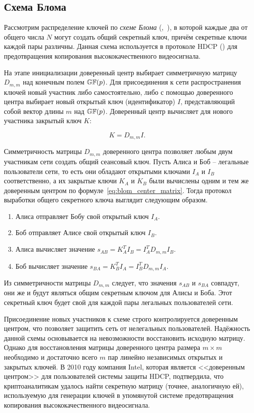 \subsection{Схема Блома}

Рассмотрим распределение ключей по \emph{схеме Блома} (,~\cite{Blom:1984, Blom:1985}), в которой каждые два  от общего числа $N$ могут создать общий секретный ключ, причём секретные ключи каждой пары различны. Данная схема используется в протоколе HDCP () для предотвращения копирования высококачественного видеосигнала.

На этапе инициализации доверенный центр выбирает симметричную матрицу $D_{m,m}$ над конечным полем $\mathbb{GF}(p)$. Для присоединения к сети распространения ключей новый участник либо самостоятельно, либо с помощью доверенного центра выбирает новый открытый ключ (идентификатор) $I$, представляющий собой вектор длины $m$ над $\mathbb{GF}(p)$. Доверенный центр вычисляет для нового участника закрытый ключ $K$:

\begin{equation}
	K = D_{m,m} I.
	\label{eq:blom_center_matrix}
\end{equation}

Симметричность матрицы $D_{m,m}$ доверенного центра позволяет любым двум участникам сети создать общий сеансовый ключ. Пусть Алиса и Боб -- легальные пользователи сети, то есть они обладают открытыми ключами $I_A$ и $I_B$ соответственно, а их закрытые ключи $K_A$ и $K_B$ были вычислены одним и тем же доверенным центром по формуле~\ref{eq:blom_center_matrix}. Тогда протокол выработки общего секретного ключа выглядит следующим образом.

\begin{enumerate}
	\item Алиса отправляет Бобу свой открытый ключ $I_A$.
	\item Боб отправляет Алисе свой открытый ключ $I_B$.
	\item Алиса вычисляет значение $s_{AB} = K^T_A I_B = I^T_A D_{m,m} I_B$.
	\item Боб вычисляет значение $s_{BA} = K^T_B I_A = I^T_B D_{m,m} I_A$.
\end{enumerate}

Из симметричности матрицы $D_{m,m}$ следует, что значения $s_{AB}$ и $s_{BA}$ совпадут, они же и будут являться общим секретным ключом для Алисы и Боба. Этот секретный ключ будет свой для каждой пары легальных пользователей сети.

Присоединение новых участников к схеме строго контролируется доверенным центром, что позволяет защитить сеть от нелегальных пользователей. Надёжность данной схемы основывается на невозможности восстановить исходную матрицу. Однако для восстановления матрицы доверенного центра размера $m \times m$ необходимо и достаточно всего $m$ пар линейно независимых открытых и закрытых ключей. В 2010 году компания Intel, которая является <<доверенным центром>> для пользователей системы защиты HDCP, подтвердила, что криптоаналитикам удалось найти секретную матрицу (точнее, аналогичную ей), используемую для генерации ключей в упомянутой системе предотвращения копирования высококачественного видеосигнала.

